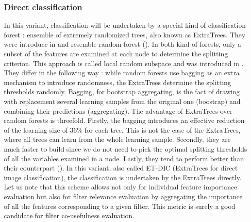\documentclass[a4paper]{report}
\begin{document}
			\subsubsection{Direct classification}
			In this variant, classification will be undertaken by a special kind of classification forest : ensemble of extremely randomized trees, also known as ExtraTrees. They were introduce in \cite{extratrees} and resemble random forest (\cite{randomforests}). In both kind of forests, only a subset of the features are examined at each node to determine the splitting criterion. This approach is called local random subspace and was introduced in \cite{randomsubspace}. They differ in the following way : while random forests use bagging as an extra mechanism to introduce randomness, the ExtraTrees determine the splitting thresholds randomly. Bagging, for bootstrap aggregating, is the fact of drawing with replacement several learning samples from the original one (boostrap) and combining their predictions (aggregating). 
			The advantage of ExtraTrees over random forests is threefold. Firstly, the bagging introduces an effective reduction of the learning size of 36\% for each tree. This is not the case of the ExtraTrees, where all trees can learn from the whole learning sample. Secondly, they are much faster to build since we do not need to pick the optimal splitting thresholds of all the variables examined in a node. Lastly, they tend to perform better than their counterpart (\cite{extratrees}).
			In this variant, also called ET-DIC (ExtraTrees for direct image classification), the classification is undertaken by the ExtraTrees directly.
			Let us note that this scheme allows not only for individual feature importance evaluation but also for filter relevance evaluation by aggregating the importance of all the features corresponding to a given filter. This metric is surely a good candidate for filter co-usefulness evaluation.
			
			
			
			
\end{document}
